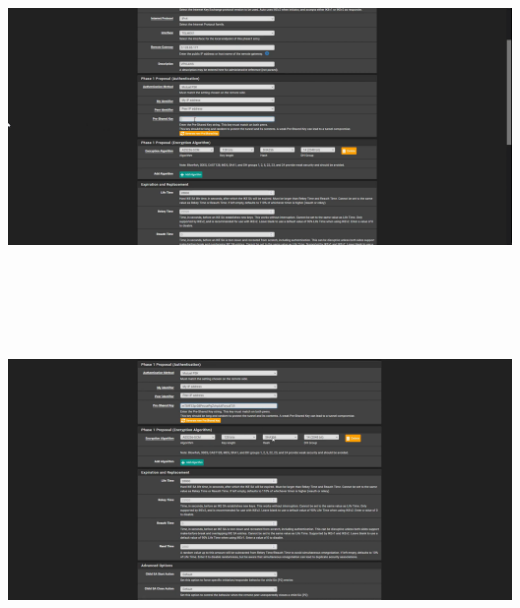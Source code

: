 \documentclass{article} %
\begin{document}
\noindent 

\noindent \includegraphics*[width=5.60in, height=3.32in, trim=0.82in 0.00in 0.62in 0.00in]{image25}

\noindent 

\noindent 

\noindent 

\noindent \includegraphics*[width=5.67in, height=3.65in, trim=1.04in 0.00in 0.91in 0.00in]{image26}

\noindent 

\noindent 

\noindent 

\noindent 

\noindent 
\end{document}
